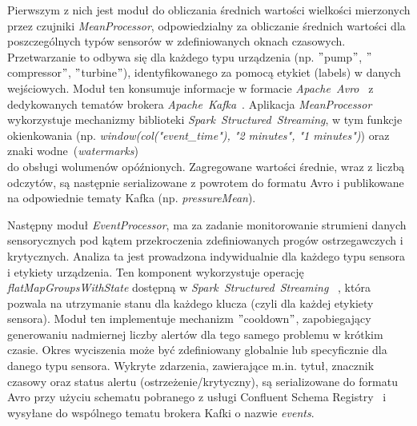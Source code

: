 Pierwszym z nich jest moduł do obliczania średnich wartości wielkości mierzonych przez czujniki \textit{MeanProcessor}, odpowiedzialny za obliczanie średnich wartości dla poszczególnych typów sensorów w zdefiniowanych oknach czasowych. Przetwarzanie to odbywa się dla każdego typu urządzenia (np. \("\)pump\("\), \("\)compressor\("\), \("\)turbine\("\)), identyfikowanego za pomocą etykiet (labels) w danych wejściowych. Moduł ten konsumuje informacje w formacie \mbox{\textit{Apache Avro}}~\cite{avro_documentation} z dedykowanych tematów brokera \mbox{\textit{Apache Kafka}}~\cite{kafka}. Aplikacja \textit{MeanProcessor} wykorzystuje mechanizmy biblioteki \mbox{\textit{Spark Structured Streaming}}, w tym funkcje okienkowania (np. \textit{window(col("event\_time"), "2 minutes", "1 minutes")}) oraz znaki wodne~(\textit{watermarks}) \\ \cite{watermarking} do obsługi wolumenów opóźnionych. Zagregowane wartości średnie, wraz z liczbą odczytów, są następnie serializowane z powrotem do formatu Avro i publikowane na odpowiednie tematy Kafka (np. \textit{pressureMean}).

Następny moduł \textit{EventProcessor}, ma za zadanie monitorowanie strumieni danych sensorycznych pod kątem przekroczenia zdefiniowanych progów ostrzegawczych i krytycznych. Analiza ta jest prowadzona indywidualnie dla każdego typu sensora i etykiety urządzenia. Ten komponent wykorzystuje operację \textit{flatMapGroupsWithState} dostępną w \mbox{\textit{Spark Structured Streaming}}~\cite{spark_streaming} , która pozwala na utrzymanie stanu dla każdego klucza (czyli dla każdej etykiety sensora). Moduł ten implementuje mechanizm \("\)cooldown\("\), zapobiegający generowaniu nadmiernej liczby alertów dla tego samego problemu w krótkim czasie. Okres wyciszenia może być zdefiniowany globalnie lub specyficznie dla danego typu sensora. Wykryte zdarzenia, zawierające m.in. tytuł, znacznik czasowy oraz status alertu (ostrzeżenie/krytyczny), są serializowane do formatu Avro przy użyciu schematu pobranego z usługi Confluent Schema Registry~\cite{confluent_schema_registry} i wysyłane do wspólnego tematu brokera Kafki o nazwie \textit{events}.

